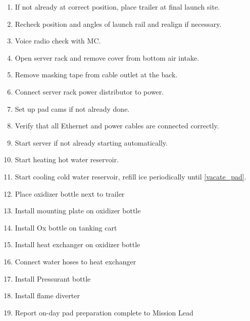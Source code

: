 \begin{enumerate}[label=P\arabic*.]
\begin{enumerate}[label*=\arabic*.]
            \item Oxidizer bottle mounting plate\leftcheckbox
            \item Heat exchanger tube\leftcheckbox
            \item Oxidizer Bottle\leftcheckbox
            \item Ethanol Bottles (\SI{2}{\liter})\leftcheckbox
            \item Flame Diverter\leftcheckbox
            \item Rocket (without fincan)\leftcheckbox
            \item Fincan\leftcheckbox
            \item 8x black M4 screws(4x8 mm, 4x10 mm) for fincan \leftcheckbox
            \item RBF umbilical locking device \leftcheckbox
            \item TRS-box (ALWAYS stays with rocket) \leftcheckbox
        \end{enumerate} 
    
    \item \label{pad_on_day_start} If not already at correct position, place trailer at final launch site.\checkbox
    \item Recheck position and angles of launch rail and realign if necessary.\checkbox
    \item Voice radio check with MC. \checkbox
    \item Open server rack and remove cover from bottom air intake.\checkbox
    \item Remove masking tape from cable outlet at the back.\checkbox
    \item Connect server rack power distributor to power.\checkbox
    \item Set up pad cams if not already done. \checkbox
    \item Verify that all Ethernet and power cables are connected correctly.\checkbox
    \item Start server if not already starting automatically.\checkbox
    \item Start heating hot water reservoir.\checkbox
    \item Start cooling cold water reservoir, refill ice periodically until \ref{vacate_pad}.\checkbox
    \item Place oxidizer bottle next to trailer \checkbox
    \item Install mounting plate on oxidizer bottle \checkbox
    \item Install Ox bottle on tanking cart \checkbox
    \item Install heat exchanger on oxidizer bottle \checkbox
    \item Connect water hoses to heat exchanger\checkbox
    \item Install Pressurant bottle\checkbox
    \item Install flame diverter\checkbox
    \item Report on-day pad preparation complete to Mission Lead\checkbox
    

\end{enumerate}
